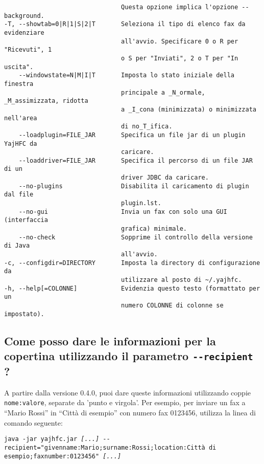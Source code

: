 \documentclass[a4paper,10pt]{scrartcl}
\begin{document}
\begin{verbatim}
                                Questa opzione implica l'opzione --background. 
-T, --showtab=0|R|1|S|2|T       Seleziona il tipo di elenco fax da evidenziare 
                                all'avvio. Specificare 0 o R per "Ricevuti", 1 
                                o S per "Inviati", 2 o T per "In uscita". 
    --windowstate=N|M|I|T       Imposta lo stato iniziale della finestra 
                                principale a _N_ormale, _M_assimizzata, ridotta
                                a _I_cona (minimizzata) o minimizzata nell'area
                                di no_T_ifica. 
    --loadplugin=FILE_JAR       Specifica un file jar di un plugin YajHFC da 
                                caricare. 
    --loaddriver=FILE_JAR       Specifica il percorso di un file JAR di un 
                                driver JDBC da caricare. 
    --no-plugins                Disabilita il caricamento di plugin dal file 
                                plugin.lst. 
    --no-gui                    Invia un fax con solo una GUI (interfaccia 
                                grafica) minimale. 
    --no-check                  Sopprime il controllo della versione di Java 
                                all'avvio. 
-c, --configdir=DIRECTORY       Imposta la directory di configurazione da 
                                utilizzare al posto di ~/.yajhfc. 
-h, --help[=COLONNE]            Evidenzia questo testo (formattato per un 
                                numero COLONNE di colonne se impostato). 
\end{verbatim}

\subsection{Come posso dare le informazioni per la copertina utilizzando il parametro \texttt{-{-}recipient} ?}

A partire dalla versione 0.4.0, puoi dare queste informazioni utilizzando coppie \texttt{nome:valore}, separate da 'punto e virgola'. Per esempio, per inviare un fax a ``Mario Rossi'' in ``Città di esempio'' con numero fax 0123456, utilizza la linea di comando seguente:

\texttt{java -jar yajhfc.jar \textit{[...]} -{-}recipient="givenname:Mario;surname:Rossi;location:Città di esempio;faxnumber:0123456" \textit{[...]}}
\end{document}
